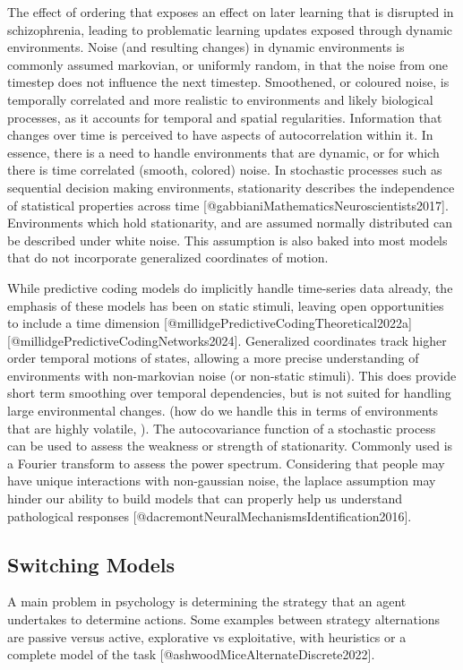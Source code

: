 \documentclass{article}
\begin{document}
The effect of ordering that exposes an effect on later learning that is disrupted in schizophrenia, leading to problematic learning updates exposed through dynamic environments. Noise (and resulting changes) in dynamic environments is commonly assumed markovian, or uniformly random, in that the noise from one timestep does not influence the next timestep. Smoothened, or coloured noise, is temporally correlated and more realistic to environments and likely biological processes, as it accounts for temporal and spatial regularities. Information that changes over time is perceived to have aspects of autocorrelation within it. In essence, there is a need to handle environments that are dynamic, or for which there is time correlated (smooth, colored) noise. In stochastic processes such as sequential decision making environments, stationarity describes the independence of statistical properties across time [@gabbianiMathematicsNeuroscientists2017]. Environments which hold stationarity, and are assumed normally distributed can be described under white noise. This assumption is also baked into most models that do not incorporate generalized coordinates of motion.

While predictive coding models do implicitly handle time-series data already, the emphasis of these models has been on static stimuli, leaving open opportunities to include a time dimension [@millidgePredictiveCodingTheoretical2022a] [@millidgePredictiveCodingNetworks2024]. Generalized coordinates track higher order temporal motions of states, allowing a more precise understanding of environments with non-markovian noise (or non-static stimuli). This does provide short term smoothing over temporal dependencies, but is not suited for handling large environmental changes. (how do we handle this in terms of environments that are highly volatile, ). The autocovariance function of a stochastic process can be used to assess the weakness or strength of stationarity. Commonly used is a Fourier transform to assess the power spectrum. Considering that people may have unique interactions with non-gaussian noise, the laplace assumption may hinder our ability to build models that can properly help us understand pathological responses [@dacremontNeuralMechanismsIdentification2016].

\subsection{Switching Models}
A main problem in psychology is determining the strategy that an agent undertakes to determine actions. Some examples between strategy alternations are passive versus active, explorative vs exploitative, with heuristics or a complete model of the task [@ashwoodMiceAlternateDiscrete2022].
\end{document}
